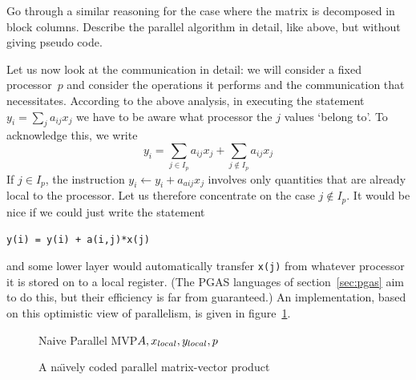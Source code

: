 \begin{exercise}
  Go through a similar reasoning for the case where the matrix is
  decomposed in block columns. Describe the parallel algorithm in
  detail, like above, but without giving pseudo code.
\end{exercise}

\def\sublocal{_{\mathrm\scriptstyle local}}

Let us now look at the communication in detail: we will consider a
fixed processor~$p$ and consider the operations it performs and the
communication that necessitates.
According to the above analysis,
in executing the statement $y_i=\sum_ja_{ij}x_j$ we have
to be aware what processor the $j$ values `belong to'. To acknowledge
this, we write
\begin{equation}
  y_i=\sum_{j\in I_p}a_{ij}x_j+\sum_{j\not\in I_p}a_{ij}x_j
  \label{eq:yi=sum-in-and-not}
\end{equation}
If $j\in I_p$, the instruction $y_i \leftarrow y_i + a_{aij} x_j$
involves only quantities that are already local to
the processor.
Let us therefore concentrate on the case
$j\not\in I_p$.
It would be nice if we could just write the statement
\begin{verbatim}
y(i) = y(i) + a(i,j)*x(j)
\end{verbatim}
and some lower layer would automatically transfer \verb+x(j)+ from
whatever processor it is stored on to a local register. (The PGAS
languages of section~\ref{sec:pgas} aim to do this, but their
efficiency is far from guaranteed.) An implementation, based on this
optimistic view of parallelism, is given in figure~\ref{fig:naive-pmvp}.

\begin{figure}
  \begin{displayprocedure}{Naive Parallel MVP}{$A,x\sublocal,y\sublocal,p$}
  \end{displayprocedure}
  \caption{A na\"\i vely coded parallel matrix-vector product}
  \label{fig:naive-pmvp}
\end{figure}

